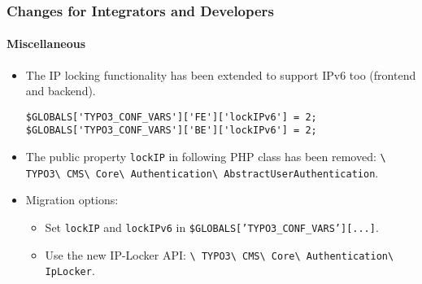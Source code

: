 \begin{frame}[fragile]
	\frametitle{Changes for Integrators and Developers}
	\framesubtitle{Miscellaneous}

	\lstset{basicstyle=\tiny\ttfamily}

	\begin{itemize}

		\item  The IP locking functionality has been extended to support IPv6 too
			(frontend and backend).

\begin{lstlisting}
$GLOBALS['TYPO3_CONF_VARS']['FE']['lockIPv6'] = 2;
$GLOBALS['TYPO3_CONF_VARS']['BE']['lockIPv6'] = 2;
\end{lstlisting}

		\item The public property \texttt{lockIP} in following PHP class has been removed:\newline
			\small
				\texttt{\textbackslash
					TYPO3\textbackslash
					CMS\textbackslash
					Core\textbackslash
					Authentication\textbackslash
					AbstractUserAuthentication}.
			\normalsize

		\item Migration options:

			\begin{itemize}\smaller
				\item[\ding{228}] Set \texttt{lockIP} and \texttt{lockIPv6} in \texttt{\$GLOBALS['TYPO3\_CONF\_VARS'][...]}.
				\item[\ding{228}] Use the new IP-Locker API:
					\texttt{\textbackslash
						TYPO3\textbackslash
						CMS\textbackslash
						Core\textbackslash
						Authentication\textbackslash
						IpLocker}.
			\end{itemize}\normalsize


	\end{itemize}

\end{frame}

